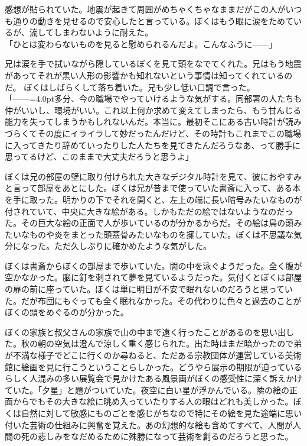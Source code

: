 \documentclass[b5j,twoside,twocolumn]{utarticle}
\begin{document}
感想が貼られていた。地震が起きて周囲がめちゃくちゃなままだがこの人がいつも通りの動きを見せるので安心したと言っている。ぼくはもう眼に涙をためているが、流してしまわないように耐えた。\\
「ひとは変わらないものを見ると慰められるんだよ。こんなふうに\tbaselineshift=2.5pt------\tbaselineshift=4.0pt」


兄は涙を手で拭いながら隠しているぼくを見て頭をなでてくれた。兄はもう地震があってそれが黒い人形の影響かも知れないという事情は知ってくれているのだ。
ぼくはしばらくして落ち着いた。兄も少し低い口調で言った。\\
「\tbaselineshift=2.5pt------\tbaselineshift=4.0pt多分、今の職場でやっていけるような気がする。同部署の人たちも仲がいいし、環境がいい。これ以上何か求めて変えてしまったら、もう甘んじる能力を失ってしまうかもしれないんだ。本当に。最初そこにある古い時計が読みづらくてその度にイライラして妙だったんだけど、その時計もこれまでこの職場に入ってきたり辞めていったりした人たちを見てきたんだろうなあ、って勝手に思ってるけど、このままで大丈夫だろうと思うよ」


ぼくは兄の部屋の壁に取り付けられた大きなデジタル時計を見て、彼におやすみと言って部屋をあとにした。ぼくは兄が昔まで使っていた書斎に入って、ある本を手に取った。明かりの下でそれを開くと、左上の端に長い暗号みたいなものが付されていて、中央に大きな絵がある。しかもただの絵ではないようなのだった。その巨大な絵の正面で人が歩いているのが分かるからだ。その絵は鳥の頭みたいなものや炎をまとった頭蓋骨みたいなものを擁していた。ぼくは不思議な気分になった。ただ久しぶりに確かめたような気がした。


ぼくは書斎からぼくの部屋まで歩いていた。闇の中を泳ぐようだった。全く腹が空かなかった。脳に釘を刺されて夢を見ているようだった。気付くとぼくは部屋の扉の前に座っていた。ぼくは単に明日が不安で眠れないのだろうと思っていた。だが布団にもぐっても全く眠れなかった。その代わりに色々と過去のことがぼくの頭をめぐるのが分かった。


ぼくの家族と叔父さんの家族で山の中まで遠く行ったことがあるのを思い出した。秋の朝の空気は澄んで涼しく重く感じられた。出た時はまだ暗かったので弟が不満な様子でどこに行くのか尋ねると、ただある宗教団体が運営している美術館に絵画を見に行こうということらしかった。どうやら展示の期限が迫っているらしく人混みの多い展覧会で見かけたある風景画がぼくの感受性に深く訴えかけていた。「夕星」と題がついていた。夜空に白い星が浮かんでいる。隣の絵の正面からでもその大きな絵に眺め入っていたりする人の眼はどれも美しかった。ぼくは自然に対して敏感にものごとを感じがちなので特にその絵を見た途端に思い付いた芸術の仕組みに興奮を覚えた。あの幻想的な絵も含めてすべて、人間が人間の死の悲しみをなだめるために殊勝になって芸術を創るのだろうと思った。
\end{document}
